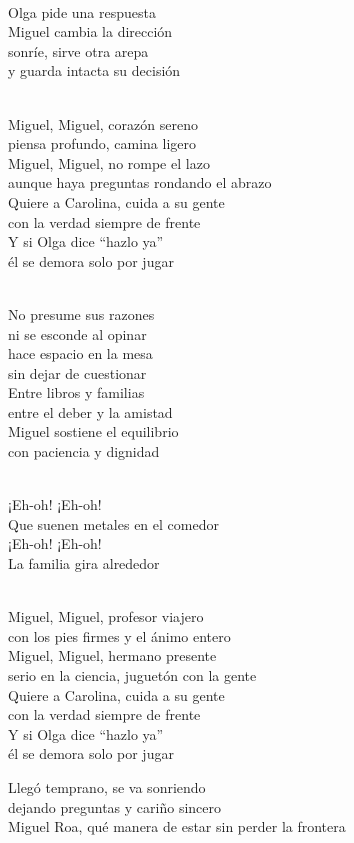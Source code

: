 \begin{lyrics}
\\
Olga pide una respuesta\\
Miguel cambia la dirección\\
sonríe, sirve otra arepa\\
y guarda intacta su decisión

\\
Miguel, Miguel, corazón sereno\\
piensa profundo, camina ligero\\
Miguel, Miguel, no rompe el lazo\\
aunque haya preguntas rondando el abrazo\\
Quiere a Carolina, cuida a su gente\\
con la verdad siempre de frente\\
Y si Olga dice “hazlo ya”\\
él se demora solo por jugar

\\
No presume sus razones\\
ni se esconde al opinar\\
hace espacio en la mesa\\
sin dejar de cuestionar\\
Entre libros y familias\\
entre el deber y la amistad\\
Miguel sostiene el equilibrio\\
con paciencia y dignidad

\\
¡Eh-oh! ¡Eh-oh!\\
Que suenen metales en el comedor\\
¡Eh-oh! ¡Eh-oh!\\
La familia gira alrededor

\\
Miguel, Miguel, profesor viajero\\
con los pies firmes y el ánimo entero\\
Miguel, Miguel, hermano presente\\
serio en la ciencia, juguetón con la gente\\
Quiere a Carolina, cuida a su gente\\
con la verdad siempre de frente\\
Y si Olga dice “hazlo ya”\\
él se demora solo por jugar

Llegó temprano, se va sonriendo\\
dejando preguntas y cariño sincero\\
Miguel Roa, qué manera
 de estar sin perder la frontera
\end{lyrics}

